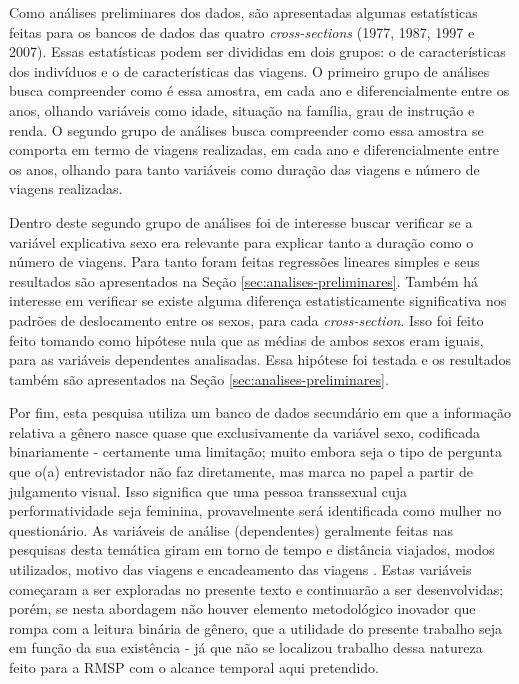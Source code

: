 Como análises preliminares dos dados, são apresentadas algumas estatísticas feitas para os bancos de dados das quatro \emph{cross-sections} (1977, 1987, 1997 e 2007). Essas estatísticas podem ser divididas em dois grupos: o de características dos indivíduos e o de características das viagens. O primeiro grupo de análises busca compreender como é essa amostra, em cada ano e diferencialmente entre os anos, olhando variáveis como idade, situação na família, grau de instrução e renda. O segundo grupo de análises busca compreender como essa amostra se comporta em termo de viagens realizadas, em cada ano e diferencialmente entre os anos, olhando para tanto variáveis como duração das viagens e número de viagens realizadas.

Dentro deste segundo grupo de análises foi de interesse buscar verificar se a variável explicativa sexo era relevante para explicar tanto a duração como o número de viagens. Para tanto foram feitas regressões lineares simples e seus resultados são apresentados na Seção \ref{sec:analises-preliminares}. Também há interesse em verificar se existe alguma diferença estatisticamente significativa nos padrões de deslocamento entre os sexos, para cada \emph{cross-section}. Isso foi feito feito tomando como hipótese nula que as médias de ambos sexos eram iguais, para as variáveis dependentes analisadas. Essa hipótese foi testada e os resultados também são apresentados na Seção \ref{sec:analises-preliminares}.

Por fim, esta pesquisa utiliza um banco de dados secundário em que a informação relativa a gênero nasce quase que exclusivamente da variável sexo, codificada binariamente - certamente uma limitação; muito embora seja o tipo de pergunta que o(a) entrevistador não faz diretamente, mas marca no papel a partir de julgamento visual. Isso significa que uma pessoa transsexual cuja performatividade seja feminina, provavelmente será identificada como mulher no questionário. As variáveis de análise (dependentes) geralmente feitas nas pesquisas desta temática giram em torno de tempo e distância viajados, modos utilizados, motivo das viagens e encadeamento das viagens \cite{HANSON2010}. Estas variáveis começaram a ser exploradas no presente texto e continuarão a ser desenvolvidas; porém, se nesta abordagem não houver elemento metodológico inovador que rompa com a leitura binária de gênero, que a utilidade do presente trabalho seja em função da sua existência - já que não se localizou trabalho dessa natureza feito para a RMSP com o alcance temporal aqui pretendido. 



